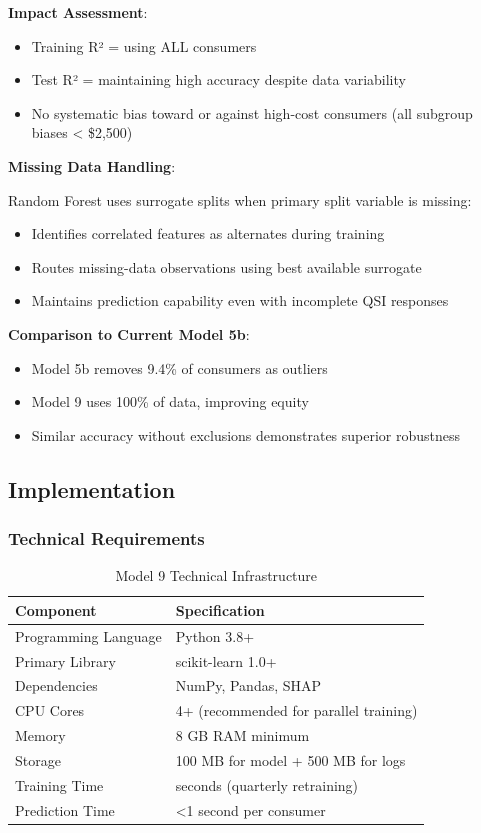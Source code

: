 \textbf{Impact Assessment}:
\begin{itemize}
    \item Training R² = \ModelNineRSquaredTrain{} using ALL \ModelNineTrainingSamples{} consumers
    \item Test R² = \ModelNineRSquaredTest{} maintaining high accuracy despite data variability
    \item No systematic bias toward or against high-cost consumers (all subgroup biases < \$2,500)
\end{itemize}

\textbf{Missing Data Handling}:

Random Forest uses surrogate splits when primary split variable is missing:
\begin{itemize}
    \item Identifies correlated features as alternates during training
    \item Routes missing-data observations using best available surrogate
    \item Maintains prediction capability even with incomplete QSI responses
\end{itemize}

\textbf{Comparison to Current Model 5b}:
\begin{itemize}
    \item Model 5b removes 9.4\% of consumers as outliers
    \item Model 9 uses 100\% of data, improving equity
    \item Similar accuracy without exclusions demonstrates superior robustness
\end{itemize}

\subsection{Implementation}

\subsubsection{Technical Requirements}

\begin{table}[h]
\centering
\caption{Model 9 Technical Infrastructure}
\begin{tabular}{ll}
\toprule
\textbf{Component} & \textbf{Specification} \\
\midrule
Programming Language & Python 3.8+ \\
Primary Library & scikit-learn 1.0+ \\
Dependencies & NumPy, Pandas, SHAP \\
CPU Cores & 4+ (recommended for parallel training) \\
Memory & 8 GB RAM minimum \\
Storage & 100 MB for model + 500 MB for logs \\
Training Time & \ModelNineTrainingTime{} seconds (quarterly retraining) \\
Prediction Time & <1 second per consumer \\
\bottomrule
\end{tabular}
\label{tab:model9_technical}
\end{table}

